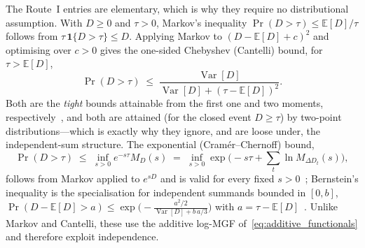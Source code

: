 \documentclass[11pt,a4paper]{article}
\theoremstyle{plain}
\theoremstyle{definition}
\theoremstyle{remark}
\begin{document}
The Route~I entries are elementary, which is why they require no distributional assumption.
With $D \ge 0$ and $\tau > 0$, Markov's inequality $\Pr(D > \tau) \le \mathbb{E}[D]/\tau$ follows from $\tau\,\mathbf{1}\{D > \tau\} \le D$.
Applying Markov to $(D - \mathbb{E}[D] + c)^2$ and optimising over $c > 0$ gives the one-sided Chebyshev (Cantelli) bound, for $\tau > \mathbb{E}[D]$,
\begin{equation}\label{eq:cantelli_surrogate}
  \Pr(D > \tau) \;\le\; \frac{\operatorname{Var}[D]}{\operatorname{Var}[D] + (\tau - \mathbb{E}[D])^2}.
\end{equation}
Both are the \emph{tight} bounds attainable from the first one and two moments, respectively~\cite{BertsimasPopescu2005}, and both are attained (for the closed event $D \ge \tau$) by two-point distributions---which is exactly why they ignore, and are loose under, the independent-sum structure.
The exponential (Cram\'er--Chernoff) bound,
\begin{equation}\label{eq:chernoff_surrogate}
  \Pr(D > \tau) \;\le\; \inf_{s > 0} e^{-s\tau} M_D(s)
  \;=\; \inf_{s > 0} \exp\!\Big( -s\tau + \textstyle\sum_t \ln M_{\Delta D_t}(s) \Big),
\end{equation}
follows from Markov applied to $e^{sD}$ and is valid for every fixed $s > 0$~\cite{Chernoff1952}; Bernstein's inequality is the specialisation for independent summands bounded in $[0,b]$, $\Pr(D - \mathbb{E}[D] > a) \le \exp\big( -\tfrac{a^2/2}{\operatorname{Var}[D] + b\,a/3} \big)$ with $a = \tau - \mathbb{E}[D]$~\cite{BoucheronLugosiMassart2013}.
Unlike Markov and Cantelli, these use the additive log-MGF of~\eqref{eq:additive_functionals} and therefore exploit independence.
\end{document}
